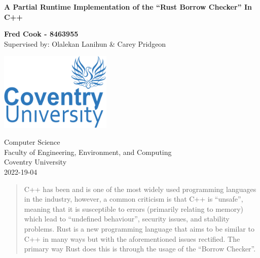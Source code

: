 \documentclass[a4paper]{article}
\begin{document}
\begin{titlepage}
    \begin{center}
        \vspace*{1cm}
            
        \Huge
        \textbf{A Partial Runtime Implementation of the ``Rust Borrow Checker'' In C++}
            
        \vspace{0.5cm}
        \LARGE
            
        \vspace{1.5cm}
            
        \textbf{Fred Cook - 8463955}\\
        Supervised by: Olalekan Lanihun \& Carey Pridgeon
            
        \vfill
            
        \vspace{0.8cm}
            
        \includegraphics[width=0.4\textwidth]{assets/coventry-university-logo.png}
            
        \Large
        Computer Science\\
        Faculty of Engineering, Environment, and Computing\\
        Coventry University\\
        2022-19-04
            
    \end{center}

    \newpage
    \begin{abstract}
        C++ has been and is one of the most widely used programming languages in the industry, however, a common criticism is that C++ is ``unsafe'', meaning that it is susceptible to errors (primarily relating to memory) which lead to ``undefined behaviour'', security issues, and stability problems. Rust is a new programming language that aims to be similar to C++ in many ways but with the aforementioned issues rectified. The primary way Rust does this is through the usage of the ``Borrow Checker''.


\end{abstract}
\end{titlepage}
\end{document}
